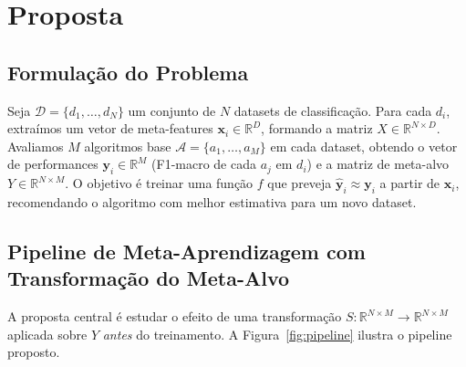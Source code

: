 \documentclass[12pt]{article}
\begin{document}
\section{Proposta}

\subsection{Formulação do Problema}

Seja $\mathcal{D} = \{d_1, \dots, d_N\}$ um conjunto de $N$ datasets de classificação. Para cada $d_i$, extraímos um vetor de meta-features $\mathbf{x}_i \in \mathbb{R}^D$, formando a matriz $X \in \mathbb{R}^{N \times D}$. Avaliamos $M$ algoritmos base $\mathcal{A} = \{a_1, \dots, a_M\}$ em cada dataset, obtendo o vetor de performances $\mathbf{y}_i \in \mathbb{R}^M$ (F1-macro de cada $a_j$ em $d_i$) e a matriz de meta-alvo $Y \in \mathbb{R}^{N \times M}$. O objetivo é treinar uma função $f$ que preveja $\hat{\mathbf{y}}_i \approx \mathbf{y}_i$ a partir de $\mathbf{x}_i$, recomendando o algoritmo com melhor estimativa para um novo dataset.

\subsection{Pipeline de Meta-Aprendizagem com Transformação do Meta-Alvo}

A proposta central é estudar o efeito de uma transformação $S: \mathbb{R}^{N \times M} \rightarrow \mathbb{R}^{N \times M}$ aplicada sobre $Y$ \textit{antes} do treinamento. A Figura~\ref{fig:pipeline} ilustra o pipeline proposto.
\end{document}
